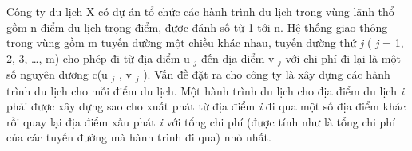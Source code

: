 Công ty du lịch X có dự án tổ chức các hành trình du lịch trong vùng lãnh thổ gồm n điểm du lịch trọng điểm, được đánh số từ 1 tới n. Hệ thống giao thông trong vùng gồm m tuyến đường một chiều khác nhau, tuyến đường thứ \emph{ j } ( \emph{ j } = 1, 2, 3, …, m) cho phép đi từ địa diểm u $_ j $ đến dịa diểm v $_ j $ với chi phí đi lại là một số nguyên dương c(u $_ j $ , v $_ j $ ). Vấn đề đặt ra cho công ty là xây dựng các hành trình du lịch cho mỗi điểm du lịch. Một hành trình du lịch cho địa điểm du lịch \emph{ i } phải được xây dựng sao cho xuất phát từ địa điểm \emph{ i } đi qua một số địa điểm khác rồi quay lại địa điểm xấu phát \emph{ i } với tổng chi phí (được tính như là tổng chi phí của các tuyến đường mà hành trình đi qua) nhỏ nhất.